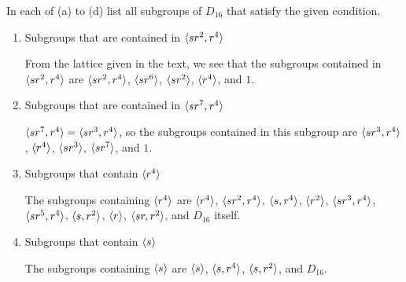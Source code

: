  In each of (a) to (d) list all subgroups of $D_{16}$ that
satisfy the given condition.
\begin{enumerate}
\item Subgroups that are contained in $\langle{sr^2,r^4}\rangle$
  \begin{solution}
    From the lattice given in the text, we see that the subgroups
    contained in $\langle{sr^2,r^4}\rangle$ are $\langle{sr^2,r^4}\rangle$, $\langle{sr^6}\rangle$,
    $\langle{sr^2}\rangle$, $\langle{r^4}\rangle$, and $1$.
  \end{solution}
\item Subgroups that are contained in $\langle{sr^7, r^4}\rangle$
  \begin{solution}
    $\langle{sr^7, r^4}\rangle = \langle{sr^3, r^4}\rangle$, so the subgroups contained in
    this subgroup are $\langle{sr^3, r^4}\rangle$, $\langle{r^4}\rangle$, $\langle{sr^3}\rangle$,
    $\langle{sr^7}\rangle$, and $1$.
  \end{solution}
\item Subgroups that contain $\langle{r^4}\rangle$
  \begin{solution}
    The subgroups containing $\langle{r^4}\rangle$ are $\langle{r^4}\rangle$,
    $\langle{sr^2,r^4}\rangle$, $\langle{s,r^4}\rangle$, $\langle{r^2}\rangle$, $\langle{sr^3,r^4}\rangle$,
    $\langle{sr^5,r^4}\rangle$, $\langle{s, r^2}\rangle$, $\langle{r}\rangle$, $\langle{sr, r^2}\rangle$, and
    $D_{16}$ itself.
  \end{solution}
\item Subgroups that contain $\langle{s}\rangle$
  \begin{solution}
    The subgroups containing $\langle{s}\rangle$ are $\langle{s}\rangle$, $\langle{s,r^4}\rangle$,
    $\langle{s,r^2}\rangle$, and $D_{16}$.
  \end{solution}
\end{enumerate}

